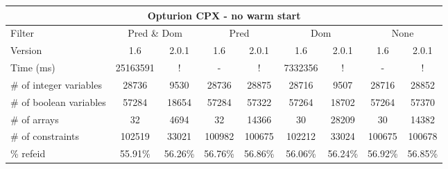 \documentclass{standalone}
\begin{document}
\begin{tabular}{lc|c|c|c|c|c|c|c}
\multicolumn{9}{c}{Opturion CPX - no warm start} \\ 
\hline\hline Filter & \multicolumn{2}{c|}{Pred \& Dom} &\multicolumn{2}{c|}{Pred}  & \multicolumn{2}{c|}{Dom} & \multicolumn{2}{c}{None} \\ 
\hline Version & 1.6 & 2.0.1 & 1.6 & 2.0.1 & 1.6 & 2.0.1 & 1.6 & 2.0.1 \\ 
Time (ms)               & 25163591 & !       & -       & !       & 7332356 & !       & -       & !       \\ 
\# of integer variables & 28736    & 9530    & 28736   & 28875   & 28716   & 9507    & 28716   & 28852	  \\ 
\# of boolean variables & 57284    & 18654   & 57284   & 57322   & 57264   & 18702   & 57264   & 57370	  \\ 
\# of arrays            & 32       & 4694    & 32      & 14366   & 30      & 28209   & 30      & 14382	  \\ 
\# of constraints       & 102519   & 33021   & 100982  & 100675  & 102212  & 33024   & 100675  & 100678  \\ 
\% refeid               & 55.91\%  & 56.26\% & 56.76\% & 56.86\% & 56.06\% & 56.24\% & 56.92\% & 56.85\% \\ 
\end{tabular} 
\end{document}
